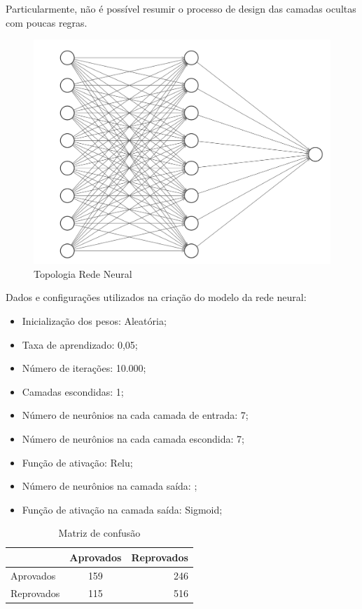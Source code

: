 \documentclass[conference]{IEEEtran}
\begin{document}
    Particularmente, não é possível resumir o processo de design das camadas ocultas com poucas regras. 
    
        \begin{figure}[htbp]
	\centerline{\includegraphics[scale=0.4]{imagens/topologia_rede_neural.png}}
	\caption{Topologia Rede Neural}
	
	\label{rede_neural}
	\end{figure}
    
   Dados e configurações utilizados na criação do modelo da rede neural:
    
     \begin{itemize}
    
    \item  Inicialização dos pesos: Aleatória;
    \item Taxa de aprendizado: 0,05;
    \item Número de iterações: 10.000;
    \item Camadas escondidas: 1;
    \item Número de neurônios na cada camada de entrada: 7;
    \item Número de neurônios na cada camada escondida: 7;
    \item Função de ativação: Relu;
    \item Número de neurônios na camada saída: ;
    \item Função de ativação na camada saída: Sigmoid;
    \end{itemize}
  
     
    \begin{table}[h]
	\caption{Matriz de confusão}
	\begin{center}
    \begin{tabular}{l | c | r }
    \hline
         \ & Aprovados  & Reprovados \\\hline
          Aprovados & 159  & 246    \\\hline
          Reprovados & 115 & 516    \\\hline
    \end{tabular}
    \end{center}
    \end{table}
     
\end{document}
